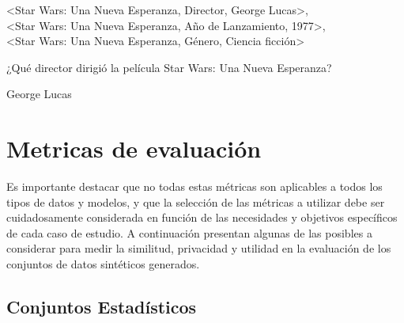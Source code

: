 \begin{tcolorbox}[colback=white,colframe=black!50!white,title=Input]
<Star Wars: Una Nueva Esperanza, Director, George Lucas>, \\
<Star Wars: Una Nueva Esperanza, Año de Lanzamiento, 1977>, \\
<Star Wars: Una Nueva Esperanza, Género, Ciencia ficción>
\end{tcolorbox}
\begin{tcolorbox}[colback=white,colframe=black!50!white,title=Pregunta]
¿Qué director dirigió la película Star Wars: Una Nueva Esperanza?
\end{tcolorbox}
\begin{tcolorbox}[colback=white,colframe=black!50!white,title=Respuesta esperada]
George Lucas
\end{tcolorbox}

\newpage
\section{Metricas de evaluación}
Es importante destacar que no todas estas métricas son aplicables a todos los tipos de datos y modelos, y que la selección de las métricas a utilizar debe ser cuidadosamente considerada en función de las necesidades y objetivos específicos de cada caso de estudio.
A continuación presentan algunas de las posibles a considerar para medir la similitud, privacidad y utilidad en la evaluación de los conjuntos de datos sintéticos generados.

\subsection{Conjuntos Estadísticos}

